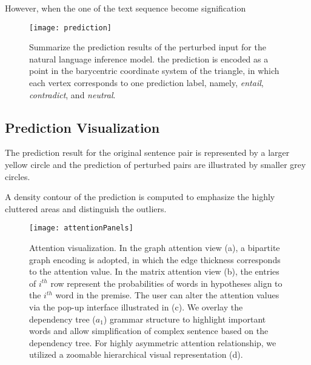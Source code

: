 However, when the one of the text sequence become signification 

\begin{figure}[htbp]
\centering
\vspace{-2mm}
 \texttt{[image: prediction]}
 \caption{
Summarize the prediction results of the perturbed input for the natural language inference model.
the prediction is encoded as a point in the barycentric coordinate system of the triangle, in which each vertex corresponds to one prediction label, namely, \emph{entail}, \emph{contradict}, and \emph{neutral}.
 }
\label{fig:prediction}
\end{figure}


\subsection{Prediction Visualization}

The prediction result for the original sentence pair is represented by a larger yellow circle and the prediction of perturbed pairs are illustrated by smaller grey circles.

A density contour of the prediction is computed to emphasize the highly cluttered areas and distinguish the outliers.

\begin{figure*}[t]
\centering
\vspace{-2mm}
 \texttt{[image: attentionPanels]}
  \vspace{-3mm}
 \caption{
Attention visualization. In the graph attention view (a), a bipartite graph encoding is adopted, in which the edge thickness corresponds to the attention value. In the matrix attention view (b), the entries of $i^{th}$ row represent the probabilities of words in hypotheses align to the $i^{th}$ word in the premise.
The user can alter the attention values via the pop-up interface illustrated in (c).
We overlay the dependency tree ($a_1$) grammar structure to highlight important words and allow simplification of complex sentence based on the dependency tree.
%
For highly asymmetric attention relationship, we utilized a zoomable hierarchical visual representation (d).
}
\label{fig:attentionVis}
\end{figure*}

